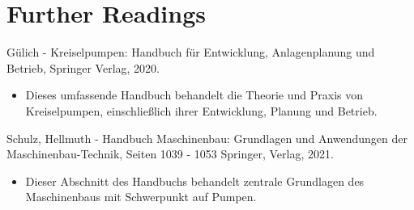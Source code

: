 \begin{code}[H]
	\caption{Einfacher Code zur Fehlererkennung}
	\label{code:fehlererkennungPumpe}
\end{code}


\section{Further Readings}
Gülich - Kreiselpumpen: Handbuch für Entwicklung, Anlagenplanung und Betrieb, Springer Verlag, 2020. \cite{Gulich:2020}
\begin{itemize}
	\item Dieses umfassende Handbuch behandelt die Theorie und Praxis von Kreiselpumpen, einschließlich ihrer Entwicklung, Planung und Betrieb.
\end{itemize}

Schulz, Hellmuth - Handbuch Maschinenbau: Grundlagen und Anwendungen der Maschinenbau-Technik, Seiten 1039 - 1053 Springer, Verlag, 2021. \cite{Schulz:2013}
\begin{itemize}
	\item Dieser Abschnitt des Handbuchs behandelt zentrale Grundlagen des Maschinenbaus mit Schwerpunkt auf Pumpen.
\end{itemize}
